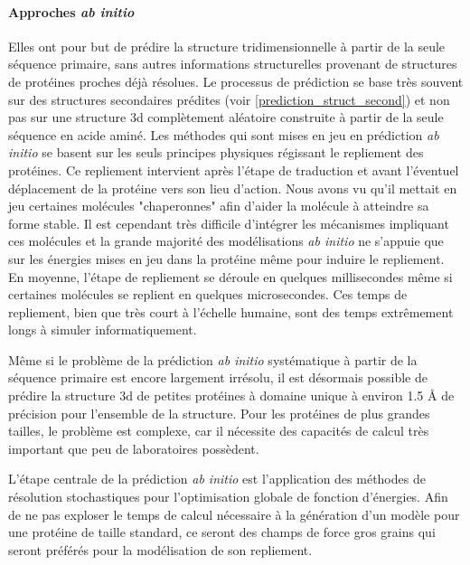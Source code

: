 \paragraph{Approches \textit{ab initio}} \label{ab_initio}

Elles ont pour but de prédire la structure tridimensionnelle à partir de la seule séquence primaire, sans autres informations structurelles provenant de structures de protéines proches déjà résolues. Le processus de prédiction se base très souvent sur des structures secondaires prédites (voir \ref{prediction_struct_second}) et non pas sur une structure 3d complètement aléatoire construite à partir de la seule séquence en acide aminé. 
Les méthodes qui sont mises en jeu en prédiction \textit{ab initio} se basent sur les seuls principes physiques régissant le repliement des protéines. Ce repliement intervient après l'étape de traduction et avant l'éventuel déplacement de la protéine vers son lieu d'action. Nous avons vu qu'il mettait en jeu certaines molécules "chaperonnes" afin d'aider la molécule à atteindre sa forme stable. Il est cependant très difficile d'intégrer les mécanismes impliquant ces molécules et la grande majorité des modélisations \textit{ab initio} ne s'appuie que sur les énergies mises en jeu dans la protéine même pour induire le repliement. En moyenne, l'étape de repliement se déroule en quelques millisecondes même si certaines molécules se replient en quelques microsecondes. Ces temps de repliement, bien que très court à l'échelle humaine, sont des temps extrêmement longs à simuler informatiquement.

Même si le problème de la prédiction \textit{ab initio} systématique à partir de la séquence primaire est encore largement irrésolu, il est désormais possible de prédire la structure 3d de petites protéines à domaine unique à environ 1.5 \r{A} de précision pour l'ensemble de la structure. Pour les protéines de plus grandes tailles, le problème est complexe, car il nécessite des capacités de calcul très important que peu de laboratoires possèdent.

L'étape centrale de la prédiction \textit{ab initio} est l'application des méthodes de résolution stochastiques pour l'optimisation globale de fonction d'énergies. Afin de ne pas exploser le temps de calcul nécessaire à la génération d'un modèle pour une protéine de taille standard, ce seront des champs de force gros grains qui seront préférés pour la modélisation de son repliement.

